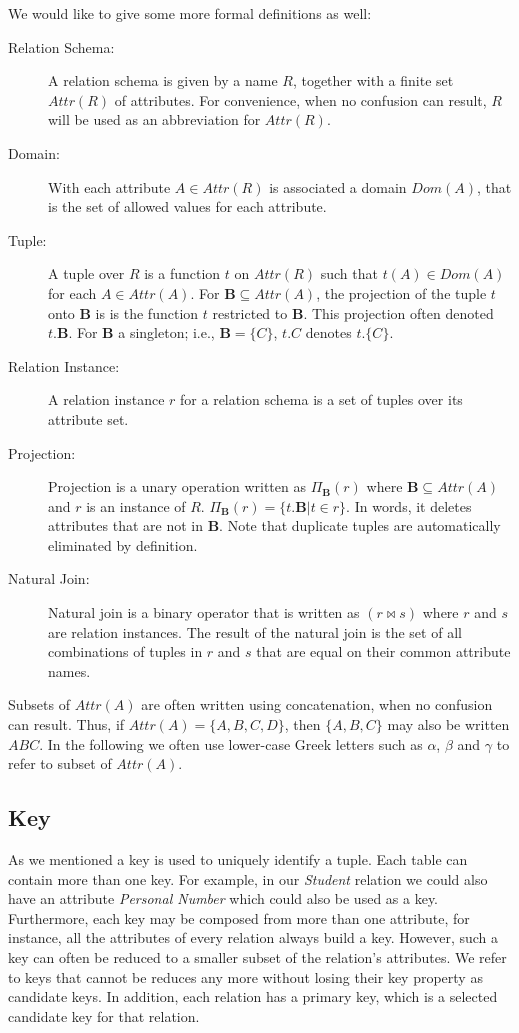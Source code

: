 We would like to give some more formal definitions as well:
\begin{description}
  \item[Relation Schema:] A relation schema is given by a name $R$, together with a finite set
    $Attr(R)$ of attributes. For convenience, when no confusion can result, $R$ will be used as an
    abbreviation for $Attr(R)$.
  \item[Domain:] With each attribute $A \in Attr(R)$ is associated a domain $Dom(A)$, that is
    the set of allowed values for each attribute. 
  \item[Tuple:] A tuple over $R$ is a function $t$ on $Attr(R)$ such that $t(A) \in Dom(A)$
    for each $A \in Attr(A)$. For $\mathbf{B} \subseteq Attr(A)$, the projection of the tuple $t$
    onto $\mathbf{B}$ is is the function $t$ restricted to $\mathbf{B}$.  This
    projection often denoted $t.\mathbf{B}$.  For $\mathbf{B}$ a singleton;
    i.e., $\mathbf{B}=\{C\}$, $t.C$ denotes $t.\{C\}$.
  \item[Relation Instance:] A relation instance $r$ for a relation schema is a set
    of tuples over its attribute set.
  \item[Projection:] Projection is a unary operation written as $\Pi_{\mathbf{B}} (r)$ 
    where $\mathbf{B} \subseteq Attr(A)$  and $r$ is an instance of $R$. 
    $\Pi_{\mathbf{B}} (r) = \{t.\mathbf{B} | t \in r\}$. In words, it deletes attributes that are not in $\mathbf{B}$. 
    Note that duplicate tuples are automatically eliminated by definition.
  \item[Natural Join:] Natural join is a binary operator that is written as $(r \Join s)$ where $r$ and $s$ are relation instances. 
    The result of the natural join is the set of all combinations of tuples in $r$ and $s$ that are equal on their common attribute names.
\end{description}

Subsets of $Attr(A)$ are often written using concatenation, when no
confusion can result.  Thus, if $Attr(A) = \{A,B,C,D\}$, then $\{A,B,C\}$ may
also be written $ABC$. In the following we often use lower-case Greek letters such as
$\alpha$, $\beta$ and $\gamma$ to refer to subset of $Attr(A)$.

\subsection{Key}
As we mentioned a key is used to uniquely identify a tuple. Each table can contain
more than one key. For example,
in our \textit{Student} relation we could also have an attribute \textit{Personal Number} 
which could also be used
as a key. Furthermore, each key may be composed from more than one attribute, for instance, 
all the attributes of every relation always build a key. However, such a key can often be reduced
to a smaller subset of the relation's attributes. 
We refer to keys that cannot be reduces any more without losing their key property as candidate keys.
In addition, each relation has a primary key, which is a selected candidate key for that relation.

